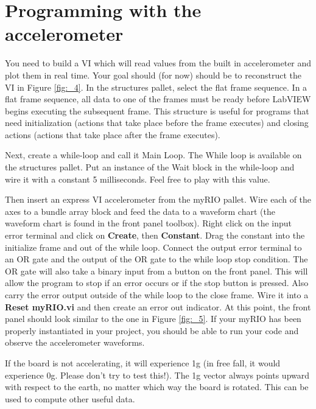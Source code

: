 \documentclass{article}
\begin{document}
\section{Programming with the accelerometer}
You need to build a VI which will read values from the built in accelerometer and plot them in real time. Your goal should (for now) should be to reconstruct the VI in Figure \ref{fig:_4}. In the structures pallet, select the flat frame sequence. In a flat frame sequence, all data to one of the frames must be ready before LabVIEW begins executing the subsequent frame. This structure is useful for programs that need initialization (actions that take place before the frame executes) and closing actions (actions that take place after the frame executes).

Next, create a while-loop and call it Main Loop. The While loop is available on the structures pallet. Put an instance of the Wait block in the while-loop and wire it with a constant 5 milliseconds. Feel free to play with this value. 

Then insert an express VI accelerometer from the myRIO pallet. Wire each of the axes to a bundle array block and feed the data to a waveform chart (the waveform chart is found in the front panel toolbox). Right click on the input error terminal and click on \textbf{Create}, then \textbf{Constant}. Drag the constant into the initialize frame and out of the while loop. Connect the output error terminal to an OR gate and the output of the OR gate to the while loop stop condition. The OR gate will also take a binary input from a button on the front panel. This will allow the program to stop if an error occurs or if the stop button is pressed. Also carry the error output outside of the while loop to the close frame. Wire it into a \textbf{Reset myRIO.vi} and then create an error out indicator. At this point, the front panel should look similar to the one in Figure \ref{fig:_5}. If your myRIO has been properly instantiated in your project, you should be able to run your code and observe the accelerometer waveforms.

If the board is not accelerating, it will experience 1g (in free fall, it would experience 0g. Please don’t try to test this!). The 1g vector always points upward with respect to the earth, no matter which way the board is rotated. This can be used to compute other useful data.
\end{document}
